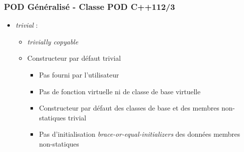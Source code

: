 \documentclass[C++.tex]{subfiles}
\begin{document}
\begin{frame}[fragile]
	\frametitle{POD Généralisé - Classe POD C++11\titlehfill{}2/3}
	\begin{itemize}
		\item \textit{trivial} :
		\begin{itemize}
			\item \textit{trivially copyable}
			\item Constructeur par défaut trivial
			\begin{itemize}
				\item Pas fourni par l'utilisateur
				\item Pas de fonction virtuelle ni de classe de base virtuelle
				\item Constructeur par défaut des classes de base et des membres non-statiques trivial
				\item Pas d'initialisation \textit{brace-or-equal-initializers} des données membres non-statiques
			\end{itemize}
		\end{itemize}
	\end{itemize}
\end{frame}
\end{document}
